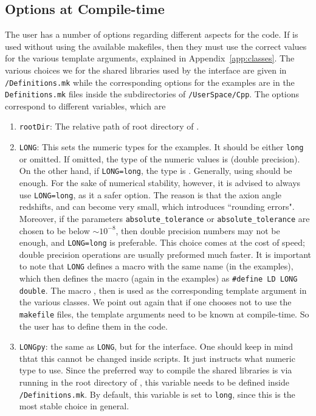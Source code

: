 \documentclass[11pt,a4paper]{article}
\begin{document}
\subsection{Options at Compile-time}\label{sec:options}
%
The user has a number of options regarding different aspects for the code. If \nsc is used without using the available makefiles, then they must use the correct values for the various template arguments, explained in Appendix~\ref{app:classes}.  The various choices we for the shared libraries used by the \PY interface are given in {\tt \nsc/Definitions.mk} while the corresponding options for the \CPP examples are in the {\tt Definitions.mk} files inside the subdirectories of {\tt \nsc/UserSpace/Cpp}. The options correspond to different variables, which are
%
\begin{enumerate}
	\item {\tt rootDir}: The relative path of root directory of \nsc.  
	\item {\tt LONG}: This sets the numeric types for the \CPP examples. It should be either {\tt long} or omitted. If omitted, the type of the numeric values is  (double precision). On the other hand, if {\tt LONG=long},  the type is  . Generally, using  should be enough. For the sake of numerical stability, however, it is advised to always use {\tt LONG=long}, as it a safer option. The reason is that the axion angle redshifts, and can become very small, which introduces ``rounding errors". Moreover, if the parameters {\tt absolute\_tolerance} or {\tt absolute\_tolerance} are chosen to be below $\sim 10^{-8}$, then double precision numbers may not be enough, and {\tt LONG=long} is preferable.  This choice comes at the cost of speed; double precision operations are usually preformed much faster. It is important to note that {\tt LONG} defines a macro with the same name (in the \CPP examples), which then defines the macro (again in the \CPP examples) as {\tt \#define LD LONG double}. The macro , then is used as the corresponding template argument in the various classes. We point out again that if one chooses not to use the {\tt makefile} files, the template arguments need to be known at compile-time. So the user has to define them in the code. 
	\item {\tt LONGpy}: the same as {\tt LONG}, but for the \PY interface. One should keep in mind thtat this cannot be changed inside \PY scripts. It just instructs  what numeric type to use. Since the preferred way to compile the shared libraries is via running  in the root directory of \nsc, this variable needs to be defined inside  {\tt \nsc/Definitions.mk}. By default, this variable is set to {\tt long}, since this is the most stable choice in general.  

\end{enumerate}
\end{document}
